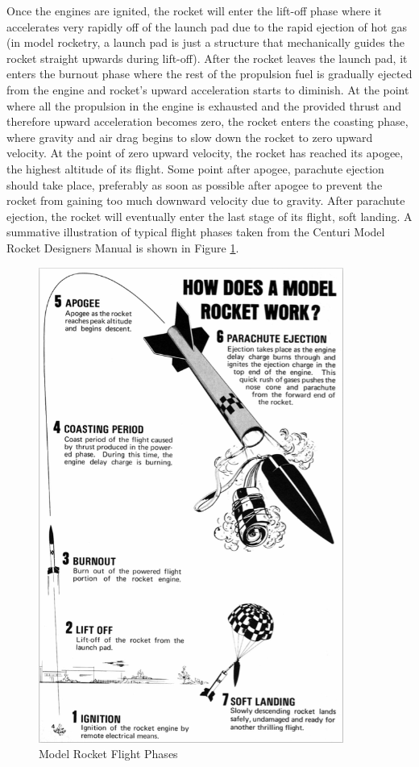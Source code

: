 \documentclass{workreport}
\begin{document}
\begin{body}
	Once the engines are ignited, the rocket will enter the lift-off phase where it accelerates very rapidly off of the launch pad due to the rapid ejection of hot gas (in model rocketry, a launch pad is just a structure that mechanically guides the rocket straight upwards during lift-off). After the rocket leaves the launch pad, it enters the burnout phase where the rest of the propulsion fuel is gradually ejected from the engine and rocket's upward acceleration starts to diminish. At the point where all the propulsion in the engine is exhausted and the provided thrust and therefore upward acceleration becomes zero, the rocket enters the coasting phase, where gravity and air drag begins to slow down the rocket to zero upward velocity. At the point of zero upward velocity, the rocket has reached its apogee, the highest altitude of its flight. Some point after apogee, parachute ejection should take place, preferably as soon as possible after apogee to prevent the rocket from gaining too much downward velocity due to gravity. After parachute ejection, the rocket will eventually enter the last stage of its flight, soft landing. A summative illustration of typical flight phases taken from the Centuri Model Rocket Designers Manual\cite{centuri_manual} is shown in Figure \ref{fig:flight_phase}.


	\begin{figure}[!ht]
		\centering
		\includegraphics[width=10cm]{./images/flight_phase.png}
		\caption{Model Rocket Flight Phases \cite{centuri_manual}}
		\label{fig:flight_phase}
	\end{figure}



\end{body}
\end{document}
